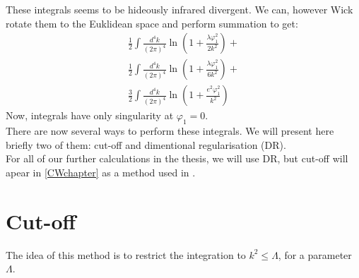 These integrals seems to be hideously infrared divergent. 
We can, however Wick rotate them to the Euklidean space and perform summation to get:
\begin{align}
\frac{1}{2} \int\frac{d^4k}{(2\pi)^4}\ln{\left(1+\frac{\lambda\varphi_1^2}{2k^2}
\right)} +\\
\frac{1}{2} \int\frac{d^4k}{(2\pi)^4}\ln{\left(1+\frac{\lambda\varphi_1^2}{6k^2}
\right)} +\\ 
\frac{3}{2} \int\frac{d^4k}{(2\pi)^4}\ln{\left(1+\frac{e^2\varphi_1^2}{k^2}\right)}
\end{align}
Now, integrals have only singularity at $\varphi_1 = 0$. \\
There are now several ways to perform these integrals. We will present here briefly two of them: 
cut-off and
dimentional regularisation (DR). \\
For all of our further calculations in the thesis, we will use DR, 
but cut-off will apear in \ref{CWchapter} 
as a method used in \cite{Coleman1973}. \\
\section{Cut-off}
The idea of this method is to restrict the integration to $k^2 \leq \Lambda$, for a 
parameter $\Lambda$. 
